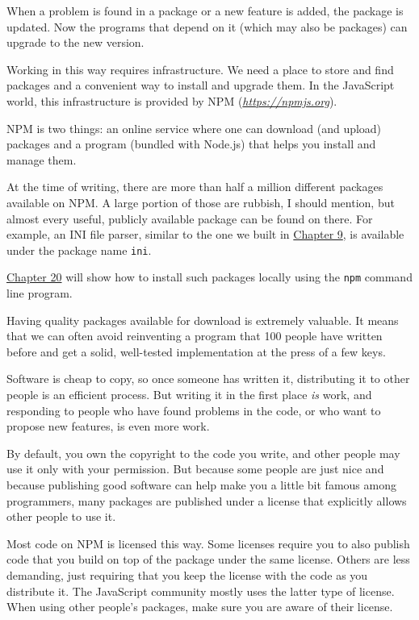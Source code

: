 When a problem is found in a package or a new feature is added, the package is updated. Now the programs that depend on it (which may also be packages) can upgrade to the new version.

\label{modules.modules_npm}Working in this way requires infrastructure. We need a place to store and find packages and a convenient way to install and upgrade them. In the JavaScript world, this infrastructure is provided by NPM (\href{https://npmjs.org}{\emph{https://npmjs.org}}).

NPM is two things: an online service where one can download (and upload) packages and a program (bundled with Node.js) that helps you install and manage them.

At the time of writing, there are more than half a million different packages available on NPM. A large portion of those are rubbish, I should mention, but almost every useful, publicly available package can be found on there. For example, an INI file parser, similar to the one we built in \hyperref[regexp]{Chapter 9}, is available under the package name \lstinline`ini`.

\hyperref[node]{Chapter 20} will show how to install such packages locally using the \lstinline`npm` command line program.

Having quality packages available for download is extremely valuable. It means that we can often avoid reinventing a program that 100 people have written before and get a solid, well-tested implementation at the press of a few keys.

Software is cheap to copy, so once someone has written it, distributing it to other people is an efficient process. But writing it in the first place \emph{is} work, and responding to people who have found problems in the code, or who want to propose new features, is even more work.

By default, you own the copyright to the code you write, and other people may use it only with your permission. But because some people are just nice and because publishing good software can help make you a little bit famous among programmers, many packages are published under a license that explicitly allows other people to use it.

Most code on NPM is licensed this way. Some licenses require you to also publish code that you build on top of the package under the same license. Others are less demanding, just requiring that you keep the license with the code as you distribute it. The JavaScript community mostly uses the latter type of license. When using other people's packages, make sure you are aware of their license.

